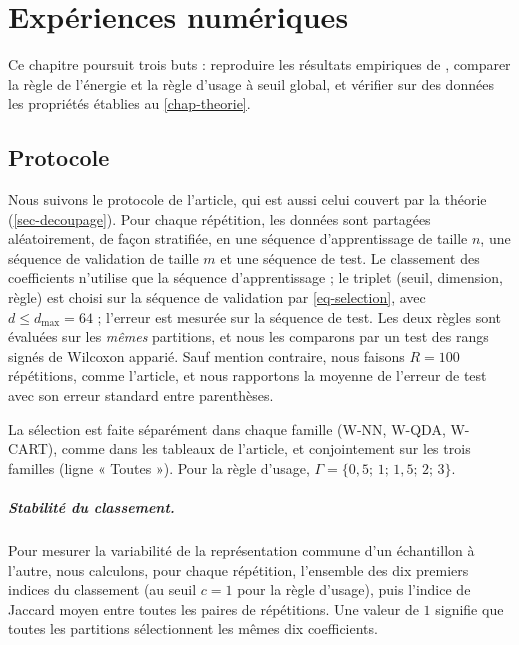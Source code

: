 \chapter{Expériences numériques}\label{chap-experiences}



Ce chapitre poursuit trois buts : reproduire les résultats empiriques de \citet{berlinet2008functional}, comparer la règle de l'énergie et la règle d'usage à seuil global, et vérifier sur des données les propriétés établies au \cref{chap-theorie}.

\section{Protocole}\label{sec-protocole}

Nous suivons le protocole de l'article, qui est aussi celui couvert par la théorie (\cref{sec-decoupage}). Pour chaque répétition, les données sont partagées aléatoirement, de façon stratifiée, en une séquence d'apprentissage de taille $n$, une séquence de validation de taille $m$ et une séquence de test. Le classement des coefficients n'utilise que la séquence d'apprentissage ; le triplet (seuil, dimension, règle) est choisi sur la séquence de validation par \eqref{eq-selection}, avec $d\le d_{\max}=64$ ; l'erreur est mesurée sur la séquence de test. Les deux règles sont évaluées sur les \emph{mêmes} partitions, et nous les comparons par un test des rangs signés de Wilcoxon apparié. Sauf mention contraire, nous faisons $R=100$ répétitions, comme l'article, et nous rapportons la moyenne de l'erreur de test avec son erreur standard entre parenthèses.

La sélection est faite séparément dans chaque famille (W-NN, W-QDA, W-CART), comme dans les tableaux de l'article, et conjointement sur les trois familles (ligne « Toutes »). Pour la règle d'usage, $\Gamma=\{0{,}5;\,1;\,1{,}5;\,2;\,3\}$.

\paragraph{Stabilité du classement.} Pour mesurer la variabilité de la représentation commune d'un échantillon à l'autre, nous calculons, pour chaque répétition, l'ensemble des dix premiers indices du classement (au seuil $c=1$ pour la règle d'usage), puis l'indice de Jaccard moyen entre toutes les paires de répétitions. Une valeur de $1$ signifie que toutes les partitions sélectionnent les mêmes dix coefficients.

